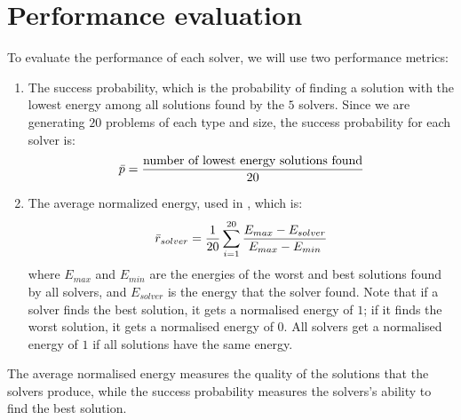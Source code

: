 

\section{Performance evaluation}
To evaluate the performance of each solver, we will use two performance metrics:
\begin{enumerate}
    \item The success probability, which is the probability of finding a solution with the lowest energy among all solutions found by the $5$ solvers. Since we are generating $20$ problems of each type and size, the success probability for each solver is:
    \begin{equation}
        \Bar{p} = \frac{\text{number of lowest energy solutions found}}{20}
    \end{equation}
    \item The average normalized energy, used in \cite{b34}, which is:
    \begin{equation}
        \Bar{r}_{solver} =  \frac{1}{20} \sum_{i = 1}^{20} \frac{E_{max} - E_{solver}}{E_{max} - E_{min}}
    \end{equation}
    where $E_{max}$ and $E_{min}$ are the energies of the worst and best solutions found by all solvers, and $E_{solver}$ is the energy that the solver found. Note that if a solver finds the best solution, it gets a normalised energy of $1$; if it finds the worst solution, it gets a normalised energy of $0$. All solvers get a normalised energy of $1$ if all solutions have the same energy.
\end{enumerate}

The average normalised energy measures the quality of the solutions that the solvers produce, while the success probability measures the solvers's ability to find the best solution.